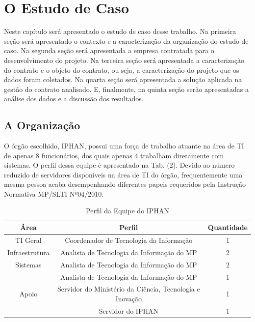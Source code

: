 \chapter[O Estudo de Caso]{O Estudo de Caso}

Neste capítulo será apresentado o estudo de caso desse trabalho. Na primeira seção será apresentado o contexto e a caracterização da organização do estudo de caso. Na segunda seção será apresentada a empresa contratada para o desenvolvimento do projeto. Na terceira seção será apresentada a caracterização do contrato e o objeto do contrato, ou seja, a caracterização do projeto que os dados foram coletados. Na quarta seção será apresentada a solução aplicada na gestão do contrato analisado. E, finalmente, na quinta seção serão apresentadas a análise dos dados e a discussão dos resultados.

\section[A Organização]{A Organização}

O órgão escolhido, IPHAN, possui uma força de trabalho atuante na área de TI de apenas 8 funcionários, dos quais apenas 4 trabalham diretamente com sistemas. O perfil dessa equipe é apresentado na Tab. (2). Devido ao número reduzido de servidores disponíveis na área de TI do órgão, frequentemente uma mesma pessoa acaba desempenhando diferentes papeis requeridos pela Instrução Normativa MP/SLTI Nº04/2010.

\begin{table}[H]
\center
\footnotesize
\begin{tabular}{|c|c|c|}
\hline
\textbf{Área}          & \textbf{Perfil}   & \textbf{Quantidade} \\ \hline
TI Geral               & Coordenador de Tecnologia da Informação   & 1                   \\ \hline
Infraestrutura         & Analista de Tecnologia da Informação do MP   & 2                   \\ \hline
Sistemas               & Analista de Tecnologia da Informação do MP   & 2                   \\ \hline
\multirow{3}{*}{Apoio} & Analista de Tecnologia da Informação do MP   & 1                   \\ \cline{2-3} 
\multicolumn{1}{|l|}{} & Servidor do Ministério da Ciência, Tecnologia e Inovação & 1                   \\ \cline{2-3} 
\multicolumn{1}{|l|}{} & Servidor do IPHAN & 1                   \\ \hline
\end{tabular}
\caption{Perfil da Equipe do IPHAN}
\end{table}

